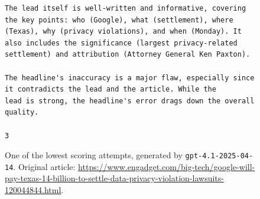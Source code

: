 \documentclass[UTF8,noindent,nohyp,parspace,titlepage,twoside,12pt]{article}
\begin{document}
\begin{figure}[!hbtp]
\begin{lstlisting}[basicstyle=\tiny\sffamily,frame=single,linewidth=\textwidth]
The lead itself is well-written and informative, covering the key points: who (Google), what (settlement), where
(Texas), why (privacy violations), and when (Monday). It also includes the significance (largest privacy-related
settlement) and attribution (Attorney General Ken Paxton).

The headline's inaccuracy is a major flaw, especially since it contradicts the lead and the article. While the
lead is strong, the headline's error drags down the overall quality.

3
      \end{lstlisting}
      \caption{%
        One of the lowest scoring attempts, generated by
        \texttt{gpt-4.1-2025-04-14}. Original article:
        \url{https://www.engadget.com/big-tech/google-will-pay-texas-14-billion-to-settle-data-privacy-violation-lawsuits-120044844.html}.
      }
    \end{figure}
\end{document}
